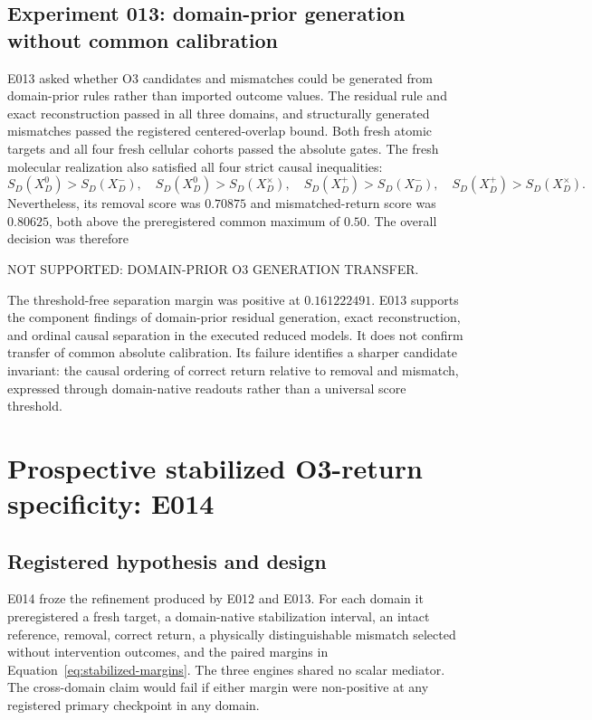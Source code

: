 \documentclass[11pt,a4paper]{article}
\newcommand{\statusnotsupported}{\textsf{NOT SUPPORTED}}
\begin{document}
\subsection{Experiment 013: domain-prior generation without common calibration}

E013 asked whether O3 candidates and mismatches could be generated from domain-prior rules rather than imported outcome values. The residual rule and exact reconstruction passed in all three domains, and structurally generated mismatches passed the registered centered-overlap bound. Both fresh atomic targets and all four fresh cellular cohorts passed the absolute gates. The fresh molecular realization also satisfied all four strict causal inequalities:
\begin{equation}
 S_D(X_D^0)>S_D(X_D^-),\quad
 S_D(X_D^0)>S_D(X_D^\times),\quad
 S_D(X_D^+)>S_D(X_D^-),\quad
 S_D(X_D^+)>S_D(X_D^\times).
 \label{eq:ordinal-topology}
\end{equation}
Nevertheless, its removal score was $0.70875$ and mismatched-return score was $0.80625$, both above the preregistered common maximum of $0.50$. The overall decision was therefore
\begin{center}
\statusnotsupported: \textsf{DOMAIN-PRIOR O3 GENERATION TRANSFER}.
\end{center}
The threshold-free separation margin was positive at $0.161222491$. E013 supports the component findings of domain-prior residual generation, exact reconstruction, and ordinal causal separation in the executed reduced models. It does not confirm transfer of common absolute calibration. Its failure identifies a sharper candidate invariant: the causal ordering of correct return relative to removal and mismatch, expressed through domain-native readouts rather than a universal score threshold.

\section{Prospective stabilized O3-return specificity: E014}

\subsection{Registered hypothesis and design}

E014 froze the refinement produced by E012 and E013. For each domain it preregistered a fresh target, a domain-native stabilization interval, an intact reference, removal, correct return, a physically distinguishable mismatch selected without intervention outcomes, and the paired margins in Equation~\eqref{eq:stabilized-margins}. The three engines shared no scalar mediator. The cross-domain claim would fail if either margin were non-positive at any registered primary checkpoint in any domain.
\end{document}
